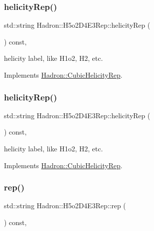 \subsubsection{\texorpdfstring{helicityRep()}{helicityRep()}\hspace{0.1cm}{\footnotesize\ttfamily [2/3]}}
{\footnotesize\ttfamily std\+::string Hadron\+::\+H5o2\+D4\+E3\+Rep\+::helicity\+Rep (\begin{DoxyParamCaption}{ }\end{DoxyParamCaption}) const\hspace{0.3cm}{\ttfamily [inline]}, {\ttfamily [virtual]}}

helicity label, like H1o2, H2, etc. 

Implements \mbox{\hyperlink{structHadron_1_1CubicHelicityRep_af1096946b7470edf0a55451cc662f231}{Hadron\+::\+Cubic\+Helicity\+Rep}}.

\mbox{\label{structHadron_1_1H5o2D4E3Rep_a71af11dde163357e0254fa7736f41250}} 
\subsubsection{\texorpdfstring{helicityRep()}{helicityRep()}\hspace{0.1cm}{\footnotesize\ttfamily [3/3]}}
{\footnotesize\ttfamily std\+::string Hadron\+::\+H5o2\+D4\+E3\+Rep\+::helicity\+Rep (\begin{DoxyParamCaption}{ }\end{DoxyParamCaption}) const\hspace{0.3cm}{\ttfamily [inline]}, {\ttfamily [virtual]}}

helicity label, like H1o2, H2, etc. 

Implements \mbox{\hyperlink{structHadron_1_1CubicHelicityRep_af1096946b7470edf0a55451cc662f231}{Hadron\+::\+Cubic\+Helicity\+Rep}}.

\mbox{\label{structHadron_1_1H5o2D4E3Rep_ab2c75db69668bb5a4d127992c3441ea4}} 
\subsubsection{\texorpdfstring{rep()}{rep()}\hspace{0.1cm}{\footnotesize\ttfamily [1/5]}}
{\footnotesize\ttfamily std\+::string Hadron\+::\+H5o2\+D4\+E3\+Rep\+::rep (\begin{DoxyParamCaption}{ }\end{DoxyParamCaption}) const\hspace{0.3cm}{\ttfamily [inline]}, {\ttfamily [virtual]}}



